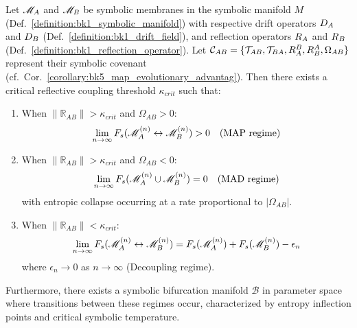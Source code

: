 \begin{theorem}
\label{theorem:bk5_enhanced_map_mad_duality}
Let $\mathscr{M}_A$ and $\mathscr{M}_B$ be symbolic membranes in the symbolic manifold $M$ (Def.~\ref{definition:bk1_symbolic_manifold}) with respective drift operators $D_A$ and $D_B$ (Def.~\ref{definition:bk1_drift_field}), and reflection operators $R_A$ and $R_B$ (Def.~\ref{definition:bk1_reflection_operator}). Let $\mathcal{C}_{AB} = \{\mathcal{T}_{AB}, \mathcal{T}_{BA}, R_A^B, R_B^A, \Omega_{AB}\}$ represent their symbolic covenant (cf.~Cor.~\ref{corollary:bk5_map_evolutionary_advantag}). Then there exists a critical reflective coupling threshold $\kappa_{crit}$ such that:
\begin{enumerate}
  \item[(i)] When $\|\mathbb{R}_{AB}\| > \kappa_{crit}$ and $\Omega_{AB} > 0$:
  \begin{equation}
  \lim_{n \to \infty} F_s(\mathscr{M}_A^{(n)} \leftrightarrow \mathscr{M}_B^{(n)}) > 0 \quad \text{(MAP regime)}
  \end{equation}
  \item[(ii)] When $\|\mathbb{R}_{AB}\| > \kappa_{crit}$ and $\Omega_{AB} < 0$:
  \begin{equation}
  \lim_{n \to \infty} F_s(\mathscr{M}_A^{(n)} \cup \mathscr{M}_B^{(n)}) = 0 \quad \text{(MAD regime)}
  \end{equation}
  with entropic collapse occurring at a rate proportional to $|\Omega_{AB}|$.
  \item[(iii)] When $\|\mathbb{R}_{AB}\| < \kappa_{crit}$:
  \begin{equation}
  \lim_{n \to \infty} F_s(\mathscr{M}_A^{(n)} \leftrightarrow \mathscr{M}_B^{(n)}) = F_s(\mathscr{M}_A^{(n)}) + F_s(\mathscr{M}_B^{(n)}) - \epsilon_n
  \end{equation}
  where $\epsilon_n \to 0$ as $n \to \infty$ (Decoupling regime).
\end{enumerate}
Furthermore, there exists a symbolic bifurcation manifold $\mathcal{B}$ in parameter space where transitions between these regimes occur, characterized by entropy inflection points and critical symbolic temperature.
\end{theorem}
